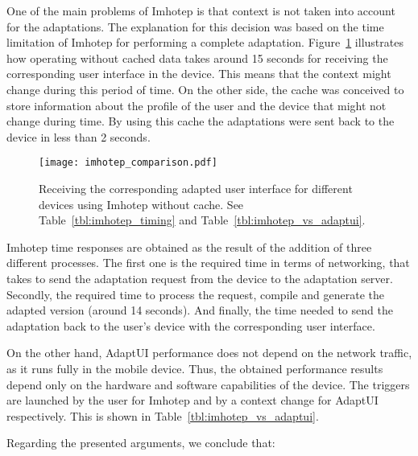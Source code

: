 One of the main problems of Imhotep is that context is not taken into account 
for the adaptations. The explanation for this decision was based on the time 
limitation of Imhotep for performing a complete adaptation. 
Figure~\ref{fig:imhotep_comparison} illustrates how operating without cached 
data takes around 15 seconds for receiving the corresponding user interface in 
the device. This means that the context might change during this period of time. 
On the other side, the cache was conceived to store information about the 
profile of the user and the device that might not change during time. By using 
this cache the adaptations were sent back to the device in less than 2 seconds.

\begin{figure}
\centering
\texttt{[image: imhotep\_comparison.pdf]}
\caption{Receiving the corresponding adapted user interface for different
devices using Imhotep without cache. See Table~\ref{tbl:imhotep_timing} and 
Table~\ref{tbl:imhotep_vs_adaptui}.}
\label{fig:imhotep_comparison}
\end{figure}


Imhotep time responses are obtained as the result of the addition of three
different processes. The first one is the required time in terms of networking,
that takes to send the adaptation request from the device to the adaptation 
server. Secondly, the required time to process the request, compile and generate 
the adapted version (around 14 seconds). And finally, the time needed to send 
the adaptation back to the user's device with the corresponding user interface. 

On the other hand, AdaptUI performance does not depend on the network traffic, 
as it runs fully in the mobile device. Thus, the obtained performance results 
depend only on the hardware and software capabilities of the device. The 
triggers are launched by the user for Imhotep and by a context change for 
AdaptUI respectively. This is shown in Table~\ref{tbl:imhotep_vs_adaptui}.

Regarding the presented arguments, we conclude that:

